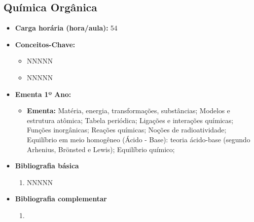 \documentclass[11pt,fleqn]{book} %
\begin{document}
\subsection{Química Orgânica}\label{disc:quimica_organica}
\begin{itemize}
	\item \textbf{Carga horária (hora/aula):} 54
	\item \textbf{Conceitos-Chave:}
	\begin{itemize}
		\item NNNNN
		\item NNNNN
	\end{itemize}
	\item \textbf{Ementa 1º Ano:}
	\begin{itemize}	
		\item \textbf{Ementa:} 
		Matéria, energia, transformações, substâncias;
		Modelos e estrutura atômica;
		Tabela periódica;
		Ligações e interações químicas;
		Funções inorgânicas;
		Reações químicas;
		Noções de radioatividade;
		Equilíbrio em meio homogêneo (Ácido - Base): teoria ácido-base (segundo Arhenius, Brönsted e Lewis);
		Equilíbrio químico;
	\end{itemize}
	\item \textbf{Bibliografia básica}
	\begin{enumerate}
		\item NNNNN
	\end{enumerate}
	\item \textbf{Bibliografia complementar}
	\begin{enumerate}
		\item 
	\end{enumerate}	
\end{itemize}

\newpage
\end{document}
